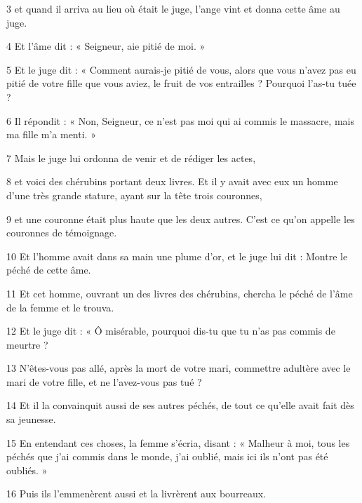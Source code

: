 \par 3 et quand il arriva au lieu où était le juge, l'ange vint et donna cette âme au juge.

\par 4 Et l'âme dit : « Seigneur, aie pitié de moi. »

\par 5 Et le juge dit : « Comment aurais-je pitié de vous, alors que vous n'avez pas eu pitié de votre fille que vous aviez, le fruit de vos entrailles ? Pourquoi l’as-tu tuée ?

\par 6 Il répondit : « Non, Seigneur, ce n'est pas moi qui ai commis le massacre, mais ma fille m'a menti. »

\par 7 Mais le juge lui ordonna de venir et de rédiger les actes,

\par 8 et voici des chérubins portant deux livres. Et il y avait avec eux un homme d'une très grande stature, ayant sur la tête trois couronnes,

\par 9 et une couronne était plus haute que les deux autres. C'est ce qu'on appelle les couronnes de témoignage.

\par 10 Et l'homme avait dans sa main une plume d'or, et le juge lui dit : Montre le péché de cette âme.

\par 11 Et cet homme, ouvrant un des livres des chérubins, chercha le péché de l'âme de la femme et le trouva.

\par 12 Et le juge dit : « Ô misérable, pourquoi dis-tu que tu n'as pas commis de meurtre ?

\par 13 N'êtes-vous pas allé, après la mort de votre mari, commettre adultère avec le mari de votre fille, et ne l'avez-vous pas tué ?

\par 14 Et il la convainquit aussi de ses autres péchés, de tout ce qu'elle avait fait dès sa jeunesse.

\par 15 En entendant ces choses, la femme s'écria, disant : « Malheur à moi, tous les péchés que j'ai commis dans le monde, j'ai oublié, mais ici ils n'ont pas été oubliés. »

\par 16 Puis ils l'emmenèrent aussi et la livrèrent aux bourreaux.

